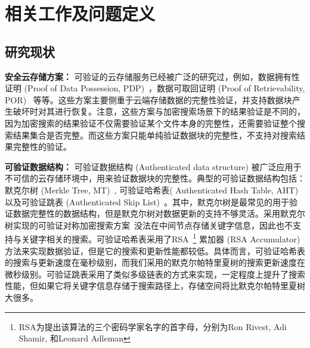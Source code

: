\chapter{相关工作及问题定义}
\label{cha:related}

\section{研究现状}
\noindent\textbf{安全云存储方案：} 可验证的云存储服务已经被广泛的研究过，例如，数据拥有性证明 (Proof of Data Possession, PDP)~\cite{ateniese2007provable, ateniese2008scalable, erway2015dynamic,zhu2012cooperative}，数据可取回证明 (Proof of Retrievability, POR)~\cite{juels2007pors, bowers2009proofs, stefanov2012iris} 等等。这些方案主要侧重于云端存储数据的完整性验证，并支持数据块产生破坏时对其进行恢复。注意，这些方案与加密搜索场景下的结果验证是不同的，因为加密搜索的结果验证不仅需要验证某个文件本身的完整性，还需要验证整个搜索结果集合是否完整。而这些方案只能单纯验证数据块的完整性，不支持对搜索结果完整性的验证。



\noindent\textbf{可验证数据结构：} 可验证数据结构 (Authenticated data structure) 被广泛应用于不可信的云存储环境中，用来验证数据块的完整性。典型的可验证数据结构包括：默克尔树 (Merkle Tree, MT)~\cite{merkle1987digital}, 可验证哈希表( Authenticated Hash Table, AHT)~\cite{papamanthou2008authenticated} 以及可验证跳表 (Authenticated Skip List)~\cite{pugh1990skip,goodrich2001implementation}。其中，默克尔树是最常见的用于验证数据完整性的数据结构，但是默克尔树对数据更新的支持不够灵活。采用默克尔树实现的可验证对称加密搜索方案~\cite{kamara2011cs2}没法在中间节点存储关键字信息，因此也不支持与关键字相关的搜索。可验证哈希表采用了RSA~\footnote{RSA为提出该算法的三个密码学家名字的首字母，分别为Ron Rivest, Adi Shamir, 和Leonard Adleman} 累加器 (RSA Accumulator) 方法来实现数据验证，但是它的搜索和更新性能都较低。具体而言，可验证哈希表的搜索与更新速度在毫秒级别，而我们采用的默克尔帕特里夏树的搜索更新速度在微秒级别。可验证跳表采用了类似多级链表的方式来实现，一定程度上提升了搜索性能，但如果它将关键字信息存储于搜索路径上，存储空间将比默克尔帕特里夏树大很多。


